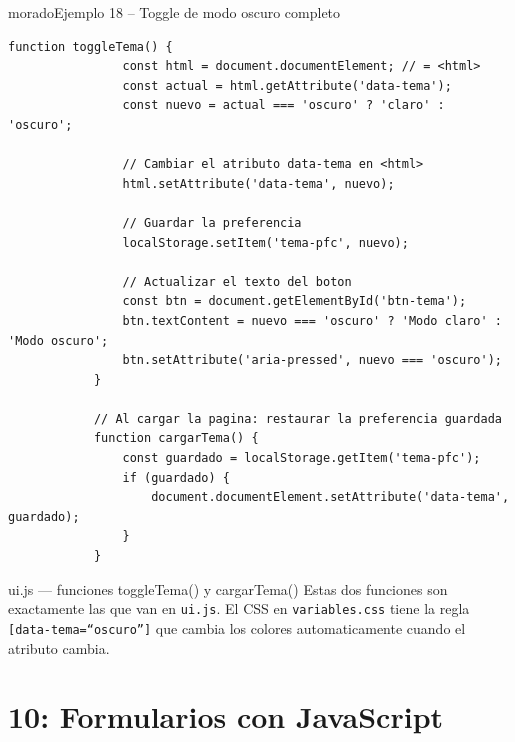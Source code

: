 \documentclass[11pt,a4paper]{article}
\begin{document}
	\begin{cajacodigo}{morado}{Ejemplo 18 -- Toggle de modo oscuro completo}
		\begin{lstlisting}[style=codejs]
			function toggleTema() {
				const html = document.documentElement; // = <html>
				const actual = html.getAttribute('data-tema');
				const nuevo = actual === 'oscuro' ? 'claro' : 'oscuro';
				
				// Cambiar el atributo data-tema en <html>
				html.setAttribute('data-tema', nuevo);
				
				// Guardar la preferencia
				localStorage.setItem('tema-pfc', nuevo);
				
				// Actualizar el texto del boton
				const btn = document.getElementById('btn-tema');
				btn.textContent = nuevo === 'oscuro' ? 'Modo claro' : 'Modo oscuro';
				btn.setAttribute('aria-pressed', nuevo === 'oscuro');
			}
			
			// Al cargar la pagina: restaurar la preferencia guardada
			function cargarTema() {
				const guardado = localStorage.getItem('tema-pfc');
				if (guardado) {
					document.documentElement.setAttribute('data-tema', guardado);
				}
			}
		\end{lstlisting}
	\end{cajacodigo}
	
	\begin{cajapractica}{ui.js --- funciones toggleTema() y cargarTema()}
		Estas dos funciones son exactamente las que van en \texttt{ui.js}. El CSS en \texttt{variables.css} tiene la regla \texttt{[data-tema=``oscuro'']} que cambia los colores automaticamente cuando el atributo cambia.
	\end{cajapractica}
	
	\section{10: Formularios con JavaScript}
	
\end{document}
